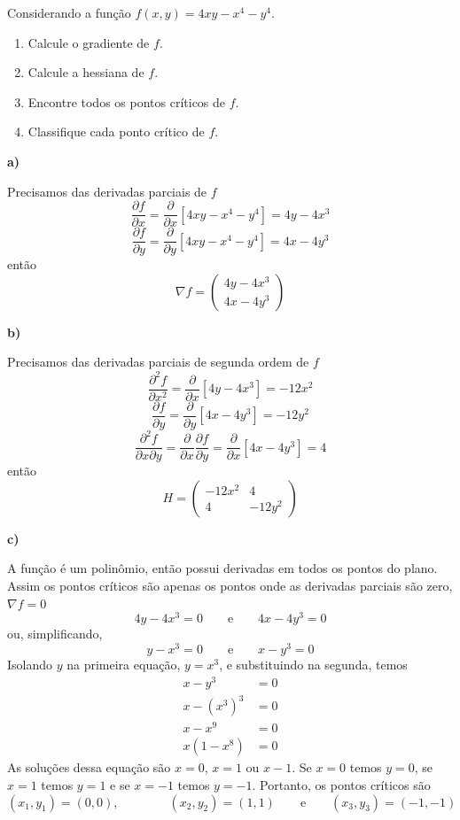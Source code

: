 \documentclass[a4paper,12pt,fleqn]{article}
\newcommand{\D}[2]{\frac{\partial {#1}}{\partial {#2}}}
\newcommand{\DS}[2]{\frac{\partial^2 {#1}}{\partial {#2}^2}}
\newcommand{\DM}[3]{\frac{\partial^2 {#1}}{\partial {#2} \partial {#3}}}
\newcommand{\vetor}[2]{\left(\begin{array}{c} #1 \\ #2 \end{array}\right)}
\begin{document}
Considerando a função
\(
  f(x, y) = 4xy -x^4 -y^4
\).

\begin{enumerate}[leftmargin=15mm,labelwidth=11.5mm,align=left]
  \item[a) {[5]}] Calcule o gradiente de $f$.
  \item[b) {[5]}] Calcule a hessiana de $f$.
  \item[c) {[10]}] Encontre todos os pontos críticos de $f$.
  \item[d) {[10]}] Classifique cada ponto crítico de $f$.
\end{enumerate}

\begin{answer}
  \noindent\textbf{a)}

  Precisamos das derivadas parciais de $f$
  \[
    \D{f}{x}
    = \D{}{x}\left[4xy -x^4 -y^4\right]
    = 4y - 4x^3
  \]
  \[
    \D{f}{y}
    = \D{}{y}\left[4xy -x^4 -y^4\right]
    = 4x -4y^3
  \]
  então
  \[
    \nabla f = \vetor{4y - 4x^3}{4x -4y^3}
  \]

  \noindent\textbf{b)}

  Precisamos das derivadas parciais de segunda ordem de $f$
  \[
    \DS{f}{x}
    = \D{}{x}\left[4y - 4x^3\right]
    = -12x^2
  \]
  \[
    \D{f}{y}
    = \D{}{y}\left[4x -4y^3\right]
    = -12y^2
  \]
  \[
    \DM{f}{x}{y}
    = \D{}{x}\D{f}{y}
    = \D{}{x}\left[4x -4y^3\right]
    = 4
  \]
  então
  \[
    H = \left(\begin{array}{cc}
            -12x^2 & 4 \\
            4 & -12y^2
        \end{array}\right)
  \]

  \noindent\textbf{c)}

  A função é um polinômio, então possui derivadas em todos os pontos do plano.
  Assim os pontos críticos são apenas os pontos onde as derivadas parciais são zero,
  \(\nabla f = 0\)
  \[
    4y - 4x^3 = 0
    \qquad\text{e}\qquad
    4x -4y^3 = 0
  \]
  ou, simplificando,
  \[
    y - x^3 = 0
    \qquad\text{e}\qquad
    x - y^3 = 0
  \]
  Isolando $y$ na primeira equação, \(y = x^3\), e substituindo na segunda, temos
  \begin{align*}
    x - y^3                & = 0 \\
    x - \left(x^3\right)^3 & = 0 \\
    x -x^9                 & = 0 \\
    x(1 - x^8)             & = 0
  \end{align*}
  As soluções dessa equação são $x=0$, $x=1$ ou $x-1$.
  Se $x=0$ temos $y=0$,
  se $x=1$ temos $y=1$ e
  se $x=-1$ temos $y=-1$.
  Portanto, os pontos críticos são
  \[
    (x_1, y_1) = (0, 0),
    \qquad\qquad
    (x_2, y_2) = (1, 1)
    \qquad\text{e}\qquad
    (x_3, y_3) = (-1, -1)
  \]


\end{answer}
\end{document}
